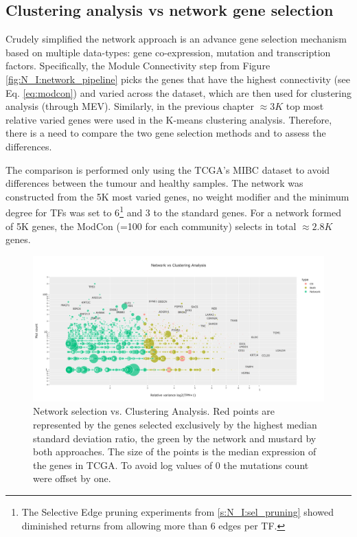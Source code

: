 \subsection{Clustering analysis vs network gene selection} \label{s:N_I:cs_vs_gene_sel}

Crudely simplified the network approach is an advance gene selection mechanism based on multiple data-types: gene co-expression, mutation and transcription factors. Specifically, the Module Connectivity step from Figure \ref{fig:N_I:network_pipeline} picks the genes that have the highest connectivity (see Eq. \ref{eq:modcon}) and varied across the dataset, which are then used for clustering analysis (through MEV). Similarly, in the previous chapter $\approx3K$ top most relative varied genes were used in the K-means clustering analysis. Therefore, there is a need to compare the two gene selection methods and to assess the differences.

The comparison is performed only using the TCGA's MIBC dataset to avoid differences between the tumour and healthy samples. The network was constructed from the 5K most varied genes, no weight modifier and the minimum degree for TFs  was set to 6\footnote{The Selective Edge pruning experiments from \cref{s:N_I:sel_pruning} showed diminished returns from allowing more than 6 edges per TF.} and 3 to the standard genes. For a network formed of 5K genes, the ModCon (=100 for each community) selects in total $\approx2.8K$ genes.


\begin{figure}[!t]    
    \centering\includegraphics[width=1.0\textwidth,keepaspectratio]{Sections/Network_I/Resources/Tum_network/ClusteringAnalysis_vs_Network_3.png}
    \caption{Network selection vs. Clustering Analysis. Red points are represented by the genes selected exclusively by the highest median standard deviation ratio, the green by the network and mustard by both approaches. The size of the points is the median expression of the genes in TCGA. To avoid log values of 0 the mutations count were offset by one.}
    \label{fig:N_I:network_ca_selection}
\end{figure}


